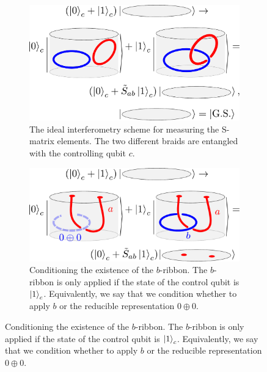 \documentclass[a4paper,twocolumn,11pt]{quantumarticle}
\begin{document}
\begin{figure}
\centering

\begin{subfigure}{0.47\textwidth}
    \includegraphics[width = \linewidth]{Figures/intef_example.pdf}
    \caption{The ideal interferometry scheme for measuring the S-matrix elements. The two different braids are entangled with the controlling qubit $c$.}
    \label{fig:intef_example}
\end{subfigure}\hfill
\begin{subfigure}{0.47\textwidth}
    \includegraphics[width=\linewidth]{Figures/intefEx.pdf}
    \caption{Conditioning the existence of the $b$-ribbon. The $b$-ribbon is only applied if the state of the control qubit is $\ket{1}_c$. Equivalently, we say that we condition whether to apply $b$ or the reducible representation $0\oplus 0$.}
    \label{fig:cond_ex}
\end{subfigure}


\vspace{15pt}


\end{figure}
\end{document}
